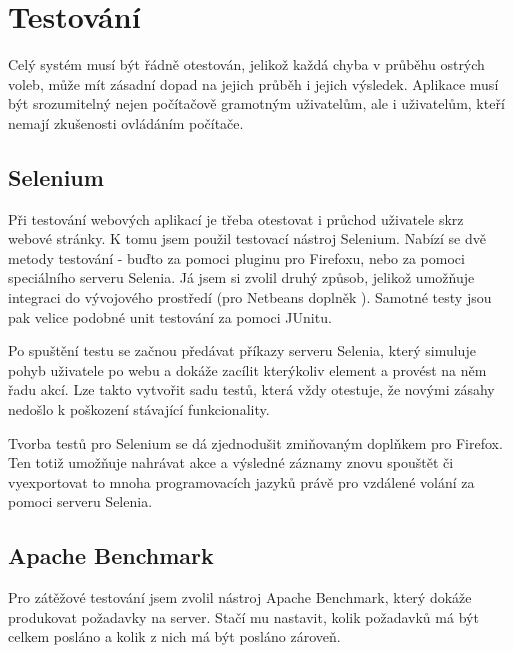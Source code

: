 \documentclass[11pt,twoside,a4paper]{book}
\begin{document}
\chapter{Testování}

Celý systém musí být řádně otestován, jelikož každá chyba v průběhu ostrých voleb, může mít zásadní dopad na jejich průběh i jejich výsledek. Aplikace musí být srozumitelný nejen počítačově gramotným uživatelům, ale i uživatelům, kteří nemají zkušenosti  ovládáním počítače. 


\section{Selenium}

Při testování webových aplikací je třeba otestovat i průchod uživatele skrz webové stránky. K tomu jsem použil testovací nástroj Selenium. Nabízí se dvě metody testování - buďto za pomoci pluginu pro Firefoxu, nebo za pomoci speciálního serveru Selenia. Já jsem si zvolil druhý způsob, jelikož umožňuje integraci do vývojového prostředí (pro Netbeans doplněk ). Samotné testy jsou pak velice podobné unit testování za pomoci JUnitu. 

Po spuštění testu se začnou předávat příkazy serveru Selenia, který simuluje pohyb uživatele po webu a dokáže zacílit kterýkoliv element a provést na něm řadu akcí. Lze takto vytvořit sadu testů, která vždy otestuje, že novými zásahy nedošlo k poškození stávající funkcionality.

Tvorba testů pro Selenium se dá zjednodušit zmiňovaným doplňkem pro Firefox. Ten totiž umožňuje nahrávat akce a výsledné záznamy znovu spouštět či vyexportovat to mnoha programovacích jazyků právě pro vzdálené volání za pomoci serveru Selenia.

\section{Apache Benchmark}

Pro zátěžové testování jsem zvolil nástroj Apache Benchmark, který dokáže produkovat požadavky na server. Stačí mu nastavit, kolik požadavků má být celkem posláno a kolik z nich má být posláno zároveň.
\end{document}

